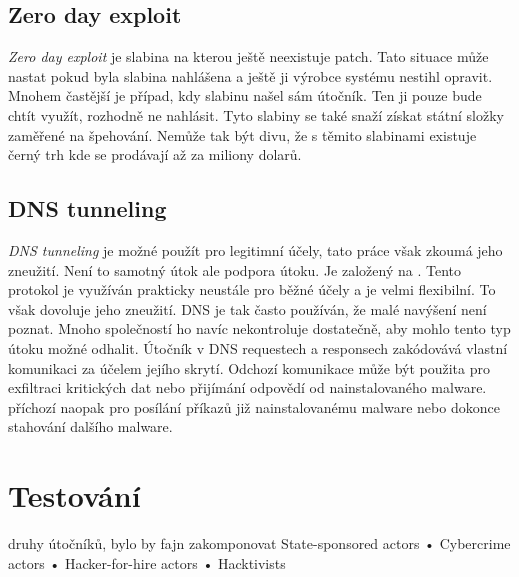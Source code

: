 \subsection{Zero day exploit}
\textit{Zero day exploit} je slabina na kterou ještě neexistuje patch.
Tato situace může nastat pokud byla slabina nahlášena a ještě ji výrobce systému nestihl opravit.
Mnohem častější je případ, kdy slabinu našel sám útočník.
Ten ji pouze bude chtít využít, rozhodně ne nahlásit.
Tyto slabiny se také snaží získat státní složky zaměřené na špehování.
Nemůže tak být divu, že s těmito slabinami existuje černý trh\cite{world_end_2021} kde se prodávají až za miliony dolarů.

\subsection{DNS tunneling}
\textit{DNS tunneling} je možné použít pro legitimní účely, tato práce však zkoumá jeho zneužití.
Není to samotný útok ale podpora útoku.
Je založený na .
Tento protokol je využíván prakticky neustále pro běžné účely a je velmi flexibilní.
To však dovoluje jeho zneužití.
\ac{DNS} je tak často používán, že malé navýšení není poznat.
Mnoho společností ho navíc nekontroluje dostatečně, aby mohlo tento typ útoku možné odhalit.
Útočník v \ac{DNS} requestech a responsech zakódovává vlastní komunikaci za účelem jejího skrytí.
Odchozí komunikace může být použita pro exfiltraci kritických dat nebo přijímání odpovědí od nainstalovaného malware.
příchozí naopak pro posílání příkazů již nainstalovanému malware nebo dokonce stahování dalšího malware.\cite{cisco_most_common_attack, bright_sec_dns_tunneling}


\section{Testování}
druhy útočníků, bylo by fajn zakomponovat
State-sponsored actors
• Cybercrime actors
• Hacker-for-hire actors
• Hacktivists


